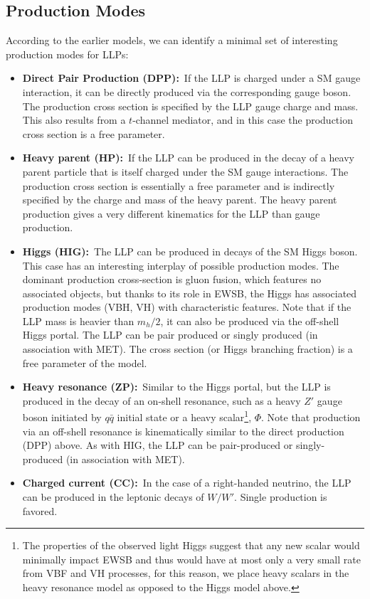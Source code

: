 \subsection{Production Modes}
According to the earlier models, we can identify a minimal set of interesting production modes for LLPs:
%
\begin{itemize}
\item {\bf Direct Pair Production (DPP):}~If the LLP is charged under a SM gauge interaction, it can be directly produced via the corresponding gauge boson. The production cross section is specified by the LLP gauge charge and mass. This also results from a $t$-channel mediator, and in this case the production cross section is a free parameter.
\item {\bf Heavy parent (HP):}~If the LLP can be produced in the decay of a heavy parent particle that is itself charged under the SM gauge interactions. The production cross section is essentially a free parameter and is indirectly specified by the charge and mass of the heavy parent. The heavy parent production gives a very different kinematics for the LLP than gauge production.
\item {\bf Higgs (HIG):}~The LLP can be produced in decays of the SM Higgs boson.  This case has an interesting interplay of possible production modes. The dominant production cross-section is  gluon fusion, which features no associated objects, but thanks to its role in EWSB, the Higgs has associated production modes (VBH, VH) with characteristic features. Note that if the LLP mass is heavier than $m_h/2$, it can also be produced via the off-shell Higgs portal. The LLP can be pair produced or singly produced (in association with MET). The cross section (or Higgs branching fraction) is a free parameter of the model.



\item {\bf Heavy resonance (ZP):}~Similar to the Higgs portal, but the LLP is produced in the decay of an on-shell resonance, such as a heavy $Z'$ gauge boson initiated by $q\bar{q}$ initial state or a heavy scalar\footnote{The properties of the observed light Higgs suggest that any new scalar would minimally impact EWSB and thus would have at most only a very small rate from VBF and VH processes, for this reason, we place heavy scalars in the heavy resonance model as opposed to the Higgs model above.}, $\Phi$.  Note that production via an off-shell resonance is kinematically similar to the direct production (DPP) above.  As with HIG, the LLP can be pair-produced or singly-produced (in association with MET). 
\item {\bf Charged current (CC):}~In the case of a right-handed neutrino, the LLP can be produced in the leptonic decays of $W/W'$. Single production is favored.
\end{itemize}

